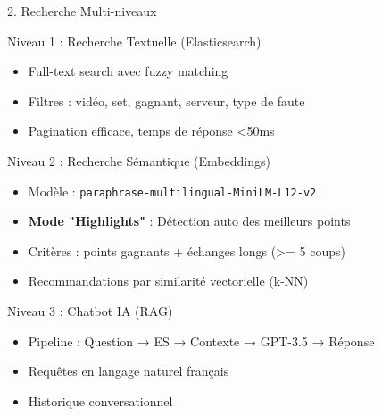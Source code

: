 \documentclass[11pt]{beamer}
\begin{document}
\begin{frame}{2. Recherche Multi-niveaux}
\begin{block}{Niveau 1 : Recherche Textuelle (Elasticsearch)}
\begin{itemize}
    \item Full-text search avec fuzzy matching
    \item Filtres : vidéo, set, gagnant, serveur, type de faute
    \item Pagination efficace, temps de réponse \textless 50ms
\end{itemize}
\end{block}

\begin{block}{Niveau 2 : Recherche Sémantique (Embeddings)}
\begin{itemize}
    \item Modèle : \texttt{paraphrase-multilingual-MiniLM-L12-v2}
    \item \textbf{Mode "Highlights"} : Détection auto des meilleurs points
    \item Critères : points gagnants + échanges longs (\textgreater= 5 coups)
    \item Recommandations par similarité vectorielle (k-NN)
\end{itemize}
\end{block}

\begin{block}{Niveau 3 : Chatbot IA (RAG)}
\begin{itemize}
    \item Pipeline : Question → ES → Contexte → GPT-3.5 → Réponse
    \item Requêtes en langage naturel français
    \item Historique conversationnel
\end{itemize}
\end{block}
\end{frame}
\end{document}
